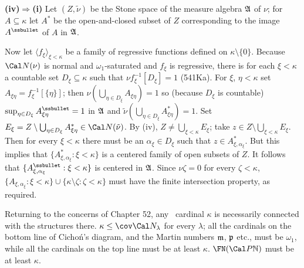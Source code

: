 {\medskip

{\bf (iv)$\Rightarrow$(i)} Let $(Z,\tilde\nu)$ be the Stone space of the
measure algebra $\frak A$ of $\nu$;
for $A\subseteq\kappa$ let $A^*$ be the
open-and-closed subset of $Z$ corresponding to
the image $A^{\ssbullet}$ of $A$ in $\frak{A}$.

Now let $\langle f_{\xi}\rangle_{\xi<\kappa}$ be a family of regressive
functions defined on $\kappa\setminus\{0\}$.
Because $\Cal N(\nu)$ is normal and $\omega_1$-saturated
and $f_{\xi}$ is regressive, there is for
each $\xi<\kappa$ a countable set $D_{\xi}\subseteq\kappa$ such that
$\nu f_{\xi}^{-1}[D_{\xi}]=1$ (541Ka).   For $\xi$, $\eta<\kappa$
set $A_{\xi\eta}=f_{\xi}^{-1}[\{\eta\}]$;  then
$\nu(\bigcup_{\eta\in D_{\xi}}A_{\xi\eta})=1$ so (because $D_{\xi}$
is countable) $\sup_{\eta\in D_{\xi}}A^{\ssbullet}_{\xi\eta}=1$ in
$\frak A$ and $\tilde\nu(\bigcup_{\eta\in D_{\xi}}A^*_{\xi\eta})=1$.
Set $E_{\xi}
=Z\setminus\bigcup_{\eta\in D_{\xi}}A^*_{\xi\eta}\in\Cal N(\tilde\nu)$.
By (iv), $Z\ne\bigcup_{\xi<\kappa}E_{\xi}$;
take $z\in Z\setminus\bigcup_{\xi<\kappa}E_{\xi}$.
Then for every $\xi<\kappa$ there must be an $\alpha_{\xi}\in D_{\xi}$
such that $z\in A^*_{\xi,\alpha_{\xi}}$.   But this implies that
$\{A^*_{\xi,\alpha_{\xi}}:\xi<\kappa\}$
is  a centered family of open subsets of $Z$.   It follows that
$\{A^{\ssbullet}_{\xi,\alpha_{\xi}}:\xi<\kappa\}$
is centered in $\frak{A}$.  Since $\nu\zeta=0$ for every $\zeta<\kappa$,
$\{A_{\xi,\alpha_{\xi}}:\xi<\kappa\}
\cup\{\kappa\setminus\zeta:\zeta<\kappa\}$ must have the finite
intersection property, as required.
}%

 Returning to the
concerns of Chapter 52,
any \am\
cardinal $\kappa$ is necessarily connected with the structures there.
\cmmnt{By 544B,} $\kappa\le\cov\Cal N_{\lambda}$ for every $\lambda$;
\cmmnt{by 544G, $\non\Cal N_{\omega}=\omega_1$, so}
all the cardinals on the bottom line of Cicho\'n's
diagram, and the Martin numbers $\frak m$,
$\frak p$ etc.\cmmnt{\ (522T)}, must be $\omega_1$, while all the
cardinals on the top line must be at least $\kappa$.
 $\FN(\Cal P\Bbb N)$ must be at least $\kappa$.

